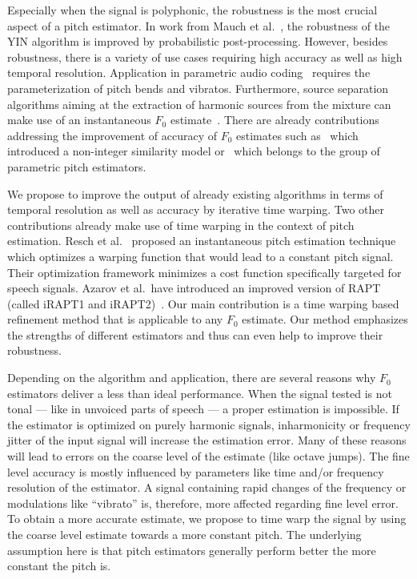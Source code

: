 Especially when the signal is polyphonic, the robustness is the most crucial aspect of a pitch estimator. In work from Mauch et al.~\cite{mauch14}, the robustness of the \textsc{YIN} algorithm is improved by probabilistic post-processing. However, besides robustness, there is a variety of use cases requiring high accuracy as well as high temporal resolution. Application in parametric audio coding~\cite{purnhagen00} requires the parameterization of pitch bends and vibratos. Furthermore, source separation algorithms aiming at the extraction of harmonic sources from the mixture can make use of an instantaneous $F_0$ estimate~\cite{virtanen08, stoter14}. There are already contributions addressing the improvement of accuracy of $F_0$ estimates such as~\cite{medan91} which introduced a non-integer similarity model or~\cite{christensen07} which belongs to the group of parametric pitch estimators.
\par
We propose to improve the output of already existing algorithms in terms of temporal resolution as well as accuracy by iterative time warping. Two other contributions already make use of time warping in the context of pitch estimation. Resch et al.~\cite{resch07} proposed an instantaneous pitch estimation technique which optimizes a warping function that would lead to a constant pitch signal. Their optimization framework minimizes a cost function specifically targeted for speech signals. Azarov et al.\ have introduced an improved version of RAPT (called iRAPT1 and iRAPT2)~\cite{azarov12}.
Our main contribution is a time warping based refinement method that is applicable to any $F_0$ estimate. Our method emphasizes the strengths of different estimators and thus can even help to improve their robustness.

Depending on the algorithm and application, there are several reasons why $F_0$ estimators deliver a less than ideal performance. When the signal tested is not tonal --- like in unvoiced parts of speech --- a proper estimation is impossible. If the estimator is optimized on purely harmonic signals, inharmonicity or frequency jitter of the input signal will increase the estimation error. Many of these reasons will lead to errors on the coarse level of the estimate (like octave jumps). The fine level accuracy is mostly influenced by parameters like time and/or frequency resolution of the estimator. A signal containing rapid changes of the frequency or modulations like ``vibrato'' is, therefore, more affected regarding fine level error. To obtain a more accurate estimate, we propose to time warp the signal by using the coarse level estimate towards a more constant pitch. The underlying assumption here is that pitch estimators generally perform better the more constant the pitch is.


